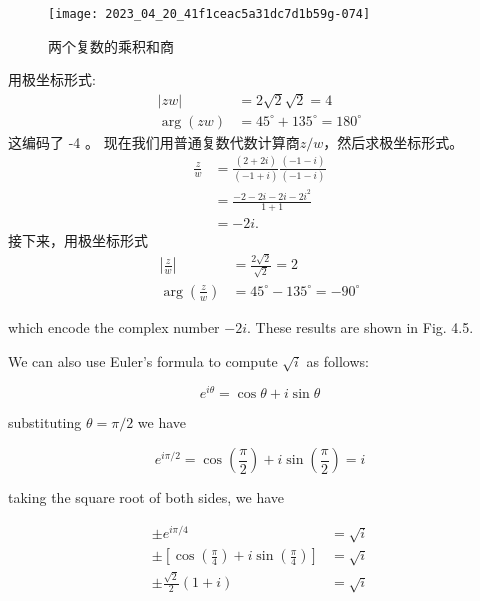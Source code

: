 \begin{figure}[htbp]
    \begin{center}
        \texttt{[image: 2023\_04\_20\_41f1ceac5a31dc7d1b59g-074]}
    \end{center}
    \caption[short]{两个复数的乘积和商}
    \label{fig:4.5}
\end{figure}

用极坐标形式:
$$
    \begin{aligned}
        |z w|      & =2 \sqrt{2} \sqrt{2}=4              \\
        \arg (z w) & =45^{\circ}+135^{\circ}=180^{\circ}
    \end{aligned}
$$
这编码了 -4 。
现在我们用普通复数代数计算商$z / w$，然后求极坐标形式。
$$
    \begin{aligned}
        \frac{z}{w} & =\frac{(2+2 i)}{(-1+i)} \frac{(-1-i)}{(-1-i)} \\
                    & =\frac{-2-2 i-2 i-2 i^{2}}{1+1}               \\
                    & =-2 i .
    \end{aligned}
$$
接下来，用极坐标形式
$$
    \begin{aligned}
        \left|\frac{z}{w}\right|      & =\frac{2 \sqrt{2}}{\sqrt{2}}=2      \\
        \arg \left(\frac{z}{w}\right) & =45^{\circ}-135^{\circ}=-90^{\circ}
    \end{aligned}
$$

which encode the complex number $-2 i$. These results are shown in Fig. 4.5.

We can also use Euler's formula to compute $\sqrt{i}$ as follows:

$$
    e^{i \theta}=\cos \theta+i \sin \theta
$$

substituting $\theta=\pi / 2$ we have

$$
    e^{i \pi / 2}=\cos \left(\frac{\pi}{2}\right)+i \sin \left(\frac{\pi}{2}\right)=i
$$

taking the square root of both sides, we have

$$
    \begin{aligned}
        \pm e^{i \pi / 4}                                                                 & =\sqrt{i} \\
        \pm\left[\cos \left(\frac{\pi}{4}\right)+i \sin \left(\frac{\pi}{4}\right)\right] & =\sqrt{i} \\
        \pm \frac{\sqrt{2}}{2}(1+i)                                                       & =\sqrt{i}
    \end{aligned}
$$

